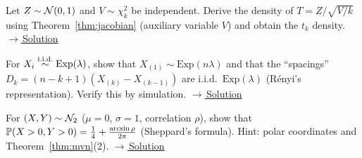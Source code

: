 \documentclass[main.tex]{subfiles}
\begin{document}
\begin{exercise}\label{exr:04-2}
Let $Z\sim\Normal(0,1)$ and $V\sim\chi^2_k$ be independent. Derive the density of $T=Z/\sqrt{V/k}$ using Theorem~\ref{thm:jacobian} (auxiliary variable $V$) and obtain the $t_k$ density.
\hfill\hyperref[coz:04-2]{\footnotesize$\rightarrow$\,Solution}
\end{exercise}

\begin{exercise}\label{exr:04-3}
For $X_i\iid\text{Exp}(\lambda)$, show that $X_{(1)}\sim\text{Exp}(n\lambda)$ and that the ``spacings'' $D_k=(n-k+1)(X_{(k)}-X_{(k-1)})$ are i.i.d.\ $\text{Exp}(\lambda)$ (Rényi's representation). Verify this by simulation.
\hfill\hyperref[coz:04-3]{\footnotesize$\rightarrow$\,Solution}
\end{exercise}

\begin{exercise}\label{exr:04-4}
For $(X,Y)\sim\Normal_2$ ($\mu=0$, $\sigma=1$, correlation $\rho$), show that $\P(X>0,Y>0)=\frac14+\frac{\arcsin\rho}{2\pi}$ (Sheppard's formula). Hint: polar coordinates and Theorem~\ref{thm:mvn}(2).
\hfill\hyperref[coz:04-4]{\footnotesize$\rightarrow$\,Solution}
\end{exercise}

\end{document}
